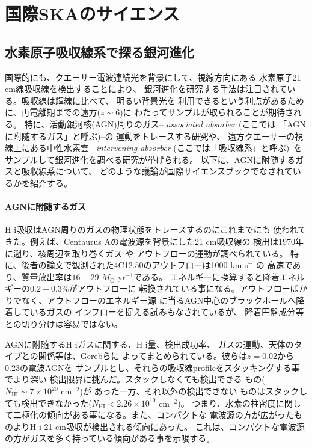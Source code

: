 \section{国際SKAのサイエンス}\label{galaxy.s2}

\subsection{水素原子吸収線系で探る銀河進化}
\label{subsec:international_21cm}

国際的にも、クエーサー電波連続光を背景にして、視線方向にある
水素原子21 cm線吸収線を検出することにより、
銀河進化を研究する手法は注目されている。吸収線は輝線に比べて、
明るい背景光を
利用できるという利点があるために、再電離期までの遠方($z\sim 6$)に
わたってサンプルが取られることが期待される。
特に、活動銀河核(AGN)周りのガス-- \textit{associated absorber} (ここでは
「AGNに附随するガス」と呼ぶ)--の
運動をトレースする研究や、
遠方クエーサーの視線上にある中性水素雲-- \textit{intervening absorber}
(ここでは「吸収線系」と呼ぶ)--を
サンプルして銀河進化を調べる研究が挙げられる\citep{morganti14}。
以下に、AGNに附随するガスと吸収線系について、
どのような議論が国際サイエンスブックでなされているかを紹介する。

\paragraph{AGNに附随するガス}

H {\sc i}吸収はAGN周りのガスの物理状態をトレースするのにこれまでにも
使われてきた。例えば、Centaurus Aの電波源を背景にした21 cm吸収線の
検出は1970年に遡り\citep{1970ApJ...161L...9R}、核周辺を取り巻くガス
\citep{2008A&A...485L...5M,2012A&A...546A..22S}や
アウトフロー\citep{2013Sci...341.1082M}の運動が調べられている。
特に、後者の論文で観測された4C12.50のアウトフローは1000 km s$^{-1}$の
高速であり、質量放出率は$16-29$ $M_\odot$ yr$^{-1}$である。
エネルギーに換算すると降着エネルギーの$0.2-0.3\%$がアウトフローに
転換されている事になる。アウトフローばかりでなく、アウトフローのエネルギー源
に当るAGN中心のブラックホールへ降着しているガスの
インフローを捉える試みもなされているが\citep{1989AJ.....97..708V}、
降着円盤成分等との切り分けは容易ではない。

AGNに附随するH {\sc i}ガスに関する、H {\sc i}量、検出成功率、
ガスの運動、天体のタイプとの関係等は、Gerebら\citep{gereb14}に
よってまとめられている。彼らは$z=0.02$から0.23の電波AGNを
サンプルとし、それらの吸収線profileをスタッキングする事でより深い
検出限界に挑んだ。スタックしなくても検出できる
もの($N_\mathrm{HI}\sim 7\times 10^{20}$ cm$^{-2}$)が
あった一方、それ以外の検出できない
ものはスタックしても検出できなかった($N_\mathrm{HI}<2.26\times 10^{19}$ cm$^{-2}$)。
つまり、水素の柱密度に関して二極化の傾向がある事になる。また、コンパクトな
電波源の方が広がったものよりH {\sc i} 21 cm吸収が検出される傾向にあった。
これは、コンパクトな電波源の方がガスを多く持っている傾向がある事を示唆する。

